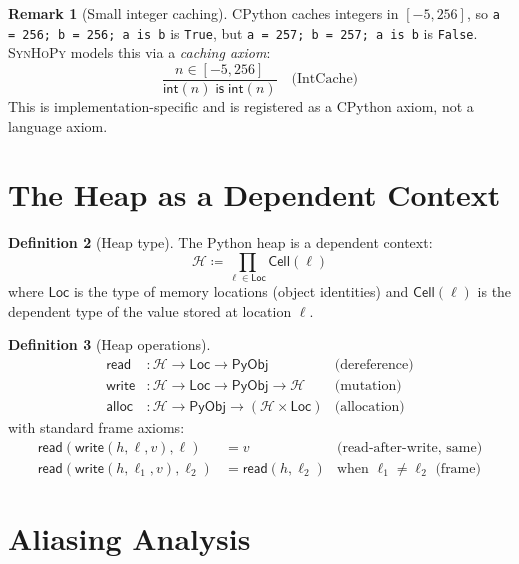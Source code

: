 \documentclass[11pt,a4paper]{report}
\theoremstyle{definition}
\newtheorem{definition}{Definition}[chapter]
\newtheorem{remark}[definition]{Remark}
\theoremstyle{plain}
\newcommand{\PyObj}{\mathsf{PyObj}}
\newcommand{\defeq}{\coloneqq}
\newcommand{\synhopy}{\textsc{SynHoPy}}
\begin{document}
\begin{remark}[Small integer caching]
CPython caches integers in $[-5, 256]$, so
\lstinline[style=python]{a = 256; b = 256; a is b} is \lstinline[style=python]{True},
but \lstinline[style=python]{a = 257; b = 257; a is b} is
\lstinline[style=python]{False}.
\synhopy{} models this via a \emph{caching axiom}:
\[
  \frac{n \in [-5, 256]}{\mathsf{int}(n) \;\mathsf{is}\; \mathsf{int}(n)} \quad \text{(IntCache)}
\]
This is implementation-specific and is registered as a CPython axiom, not a language axiom.
\end{remark}


\section{The Heap as a Dependent Context}

\begin{definition}[Heap type]
The Python heap is a dependent context:
\[
  \mathcal{H} \defeq \prod_{\ell \in \mathsf{Loc}} \mathsf{Cell}(\ell)
\]
where $\mathsf{Loc}$ is the type of memory locations (object identities) and
$\mathsf{Cell}(\ell)$ is the dependent type of the value stored at location $\ell$.
\end{definition}

\begin{definition}[Heap operations]
\begin{align}
  \mathsf{read} &: \mathcal{H} \to \mathsf{Loc} \to \PyObj & \text{(dereference)} \\
  \mathsf{write} &: \mathcal{H} \to \mathsf{Loc} \to \PyObj \to \mathcal{H} & \text{(mutation)} \\
  \mathsf{alloc} &: \mathcal{H} \to \PyObj \to (\mathcal{H} \times \mathsf{Loc}) & \text{(allocation)}
\end{align}
with standard frame axioms:
\begin{align}
  \mathsf{read}(\mathsf{write}(h, \ell, v), \ell) &= v & \text{(read-after-write, same)} \\
  \mathsf{read}(\mathsf{write}(h, \ell_1, v), \ell_2) &= \mathsf{read}(h, \ell_2) & \text{when } \ell_1 \neq \ell_2 \text{ (frame)}
\end{align}
\end{definition}


\section{Aliasing Analysis}
\end{document}
